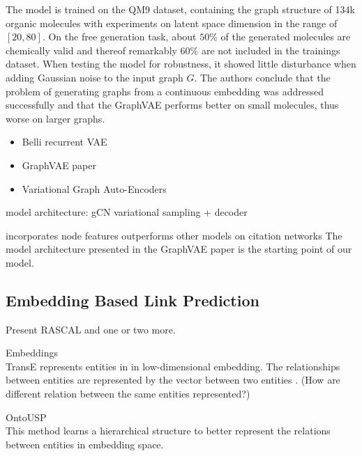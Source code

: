 The model is trained on the QM9 dataset, containing the graph structure of 134k organic molecules with experiments on latent space dimension in the range of $[20,80]$. On the free generation task, about $50\%$ of the generated molecules are chemically valid and thereof remarkably $60\%$ are not included in the trainings dataset. When testing the model for robustness, it showed little disturbance when adding Gaussian noise to the input graph $G$. The authors conclude that the problem of generating graphs
from a continuous embedding was addressed successfully and that the GraphVAE performs better on small molecules, thus worse on larger graphs.


\begin{itemize}
    \item Belli recurrent VAE
    \item GraphVAE paper
    \item Variational Graph Auto-Encoders
\end{itemize}


model architecture: gCN variational sampling + decoder

incorporates node features
outperforms other models on citation networks
The model architecture presented in the GraphVAE paper is the starting point of our model.


\subsection{Embedding Based Link Prediction}
\label{ssec:embedlp}

Present RASCAL and one or two more.

\Graph Embeddings\\
TransE represents entities in in low-dimensional embedding. The relationships between entities are represented by the vector between two entities \cite{bordes_translating_2013}.
(How are different relation between the same entities represented?)

OntoUSP\\
This method learns a hierarchical structure to better represent the relations between entities in embedding space.
